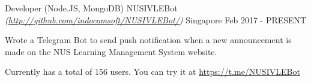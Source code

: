 

\begin{cventries}

		
	
	\cventry
		{Developer (Node.JS, MongoDB)} %
		{NUSIVLEBot \textmd{\em\tiny(\url{http://github.com/indocomsoft/NUSIVLEBot/})}} %
		{Singapore} %
		{Feb 2017 - PRESENT} %
		{
			\begin{cvitems} %
				\item {Wrote a Telegram Bot to send push notification when a new announcement is made on the NUS Learning Management System website.}
				\item {Currently has a total of 156 users. You can try it at \url{https://t.me/NUSIVLEBot}}
			\end{cvitems}
		}
    

\end{cventries}

